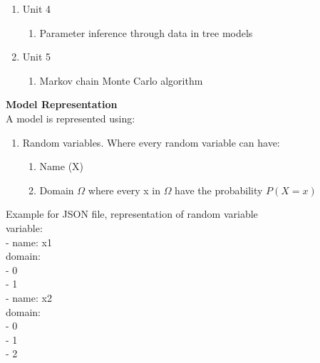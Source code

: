 \documentclass{article}
\begin{document}
\begin{enumerate}
\begin{enumerate}
        \end{enumerate}
        \item Unit 4\\
        \begin{enumerate}
            \item Parameter inference through data in tree models
        \end{enumerate}
        \item Unit 5\\
        \begin{enumerate}
            \item Markov chain Monte Carlo algorithm
        \end{enumerate}
    \end{enumerate}

    \textbf{Model Representation}\\
    A model is represented using:
    \vspace{0.1cm}
    \begin{enumerate}
        \item Random variables. Where every random variable can have:
        \begin{enumerate}
            \item Name (X)
            \item Domain $\Omega$ where every x in $\Omega$ have the probability $P(X=x)$
        \end{enumerate}
    \end{enumerate}
    Example for JSON file, representation of random variable\\
    variable:\\
            \-\quad - name: x1\\
            \-\quad\quad   domain:\\
            \-\quad\quad - 0\\
            \-\quad\quad - 1\\
            \-\quad - name: x2\\
            \-\quad\quad   domain:\\
            \-\quad\quad - 0\\
            \-\quad\quad - 1\\
            \-\quad\quad - 2\\
    
\end{document}
